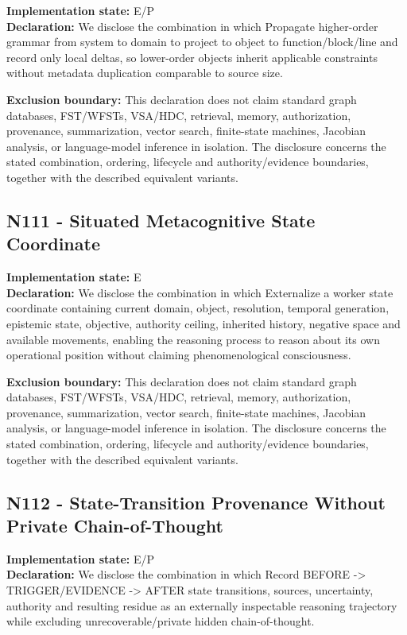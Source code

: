 \documentclass[
  10pt,
  letterpaper,
]{article}
\begin{document}
\textbf{Implementation state:} E/P\\
\textbf{Declaration:} We disclose the combination in which Propagate
higher-order grammar from system to domain to project to object to
function/block/line and record only local deltas, so lower-order objects
inherit applicable constraints without metadata duplication comparable
to source size.

\textbf{Exclusion boundary:} This declaration does not claim standard
graph databases, FST/WFSTs, VSA/HDC, retrieval, memory, authorization,
provenance, summarization, vector search, finite-state machines,
Jacobian analysis, or language-model inference in isolation. The
disclosure concerns the stated combination, ordering, lifecycle and
authority/evidence boundaries, together with the described equivalent
variants.

\subsection{N111 - Situated Metacognitive State
Coordinate}\label{n111---situated-metacognitive-state-coordinate}

\textbf{Implementation state:} E\\
\textbf{Declaration:} We disclose the combination in which Externalize a
worker state coordinate containing current domain, object, resolution,
temporal generation, epistemic state, objective, authority ceiling,
inherited history, negative space and available movements, enabling the
reasoning process to reason about its own operational position without
claiming phenomenological consciousness.

\textbf{Exclusion boundary:} This declaration does not claim standard
graph databases, FST/WFSTs, VSA/HDC, retrieval, memory, authorization,
provenance, summarization, vector search, finite-state machines,
Jacobian analysis, or language-model inference in isolation. The
disclosure concerns the stated combination, ordering, lifecycle and
authority/evidence boundaries, together with the described equivalent
variants.

\subsection{N112 - State-Transition Provenance Without Private
Chain-of-Thought}\label{n112---state-transition-provenance-without-private-chain-of-thought}

\textbf{Implementation state:} E/P\\
\textbf{Declaration:} We disclose the combination in which Record BEFORE
-\textgreater{} TRIGGER/EVIDENCE -\textgreater{} AFTER state
transitions, sources, uncertainty, authority and resulting residue as an
externally inspectable reasoning trajectory while excluding
unrecoverable/private hidden chain-of-thought.
\end{document}
